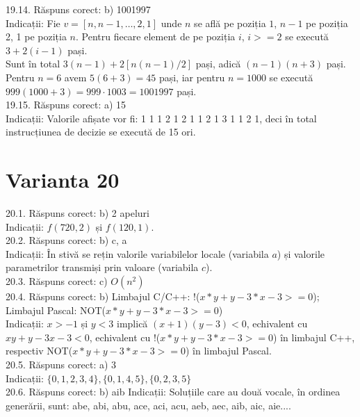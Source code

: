 19.14. Răspuns corect: b) 1001997\\
Indicații: Fie $v=[n, n-1, \ldots, 2,1]$ unde $n$ se află pe poziția $1$, $n-1$ pe poziția 2, 1 pe poziția $n$. Pentru fiecare element de pe poziția $i$, $i>=2$ se execută $3+2(i-1)$ pași.\\ Sunt în total $3(n-1)+2[n(n-1) / 2]$ pași, adică $(n-1)(n+3)$ pași.\\ Pentru $n=6$ avem $5(6+3)=45$ pași, iar pentru $n=1000$ se execută $999(1000+3)=999 \cdot 1003=1001997$ pași.\\

19.15. Răspuns corect: a) 15\\
Indicații: Valorile afișate vor fi: 1 1 1 2 1 2 1 1 2 1 3 1 1 2 1, deci în total instrucțiunea de decizie se execută de 15 ori.\\

\section*{Varianta 20}

20.1. Răspuns corect: b) 2 apeluri\\
Indicații: $f(720, 2)$ și $f(120, 1)$.\\

20.2. Răspuns corect: b) c, a\\
Indicații: În stivă se rețin valorile variabilelor locale (variabila $a$) și valorile parametrilor transmiși prin valoare (variabila $c$).\\

20.3. Răspuns corect: c) $O\left(n^{2}\right)$\\

20.4. Răspuns corect: b) Limbajul C/C++: !($x*y+y-3*x-3>=0$);\\ Limbajul Pascal: NOT($x*y+y-3*x-3>=0$)\\
Indicații: $x>-1$ și $y<3$ implică $(x+1)(y-3)<0$, echivalent cu $x y+y-3 x-3<0$, echivalent cu !($x*y+y-3*x-3>=0$) în limbajul C++, respectiv NOT($x*y+y-3*x-3>=0$) în limbajul Pascal.\\

20.5. Răspuns corect: a) 3\\
Indicații: $\{0,1,2,3,4\},\{0,1,4,5\},\{0,2,3,5\}$\\

20.6. Răspuns corect: b) aib
Indicații: Soluțiile care au două vocale, în ordinea generării, sunt: abe, abi, abu, ace, aci, acu, aeb, aec, aib, aic, aie....\\

